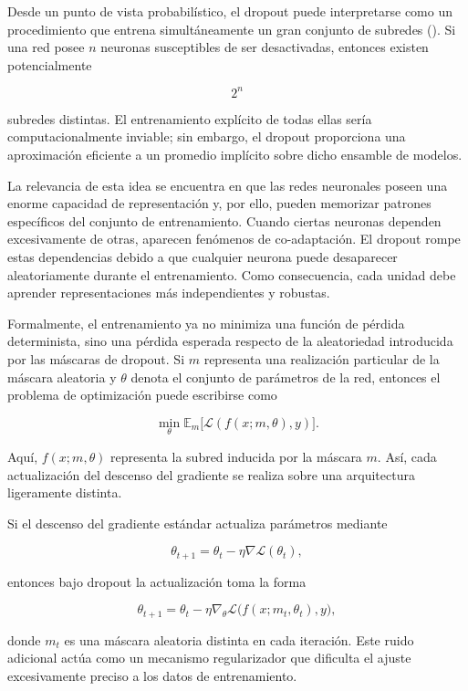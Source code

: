 \documentclass[
  spanish,
  us-letterpaper,
]{scrreprt}
\theoremstyle{definition}
\theoremstyle{remark}
\begin{document}
Desde un punto de vista probabilístico, el dropout puede interpretarse
como un procedimiento que entrena simultáneamente un gran conjunto de
subredes (). Si una
red posee \(n\) neuronas susceptibles de ser desactivadas, entonces
existen potencialmente

\[
2^n
\]

subredes distintas. El entrenamiento explícito de todas ellas sería
computacionalmente inviable; sin embargo, el dropout proporciona una
aproximación eficiente a un promedio implícito sobre dicho ensamble de
modelos.

La relevancia de esta idea se encuentra en que las redes neuronales
poseen una enorme capacidad de representación y, por ello, pueden
memorizar patrones específicos del conjunto de entrenamiento. Cuando
ciertas neuronas dependen excesivamente de otras, aparecen fenómenos de
co-adaptación. El dropout rompe estas dependencias debido a que
cualquier neurona puede desaparecer aleatoriamente durante el
entrenamiento. Como consecuencia, cada unidad debe aprender
representaciones más independientes y robustas.

Formalmente, el entrenamiento ya no minimiza una función de pérdida
determinista, sino una pérdida esperada respecto de la aleatoriedad
introducida por las máscaras de dropout. Si \(m\) representa una
realización particular de la máscara aleatoria y \(\theta\) denota el
conjunto de parámetros de la red, entonces el problema de optimización
puede escribirse como

\[
\min_{\theta} \mathbb{E}_m \big[ \mathcal{L}(f(x; m, \theta), y) \big].
\]

Aquí, \(f(x; m, \theta)\) representa la subred inducida por la máscara
\(m\). Así, cada actualización del descenso del gradiente se realiza
sobre una arquitectura ligeramente distinta.

Si el descenso del gradiente estándar actualiza parámetros mediante

\[
\theta_{t+1} = \theta_t - \eta \nabla \mathcal{L}(\theta_t),
\]

entonces bajo dropout la actualización toma la forma

\[
\theta_{t+1} = \theta_t - \eta \nabla_\theta \mathcal{L}\big(f(x; m_t, \theta_t), y\big),
\]

donde \(m_t\) es una máscara aleatoria distinta en cada iteración. Este
ruido adicional actúa como un mecanismo regularizador que dificulta el
ajuste excesivamente preciso a los datos de entrenamiento.
\end{document}
